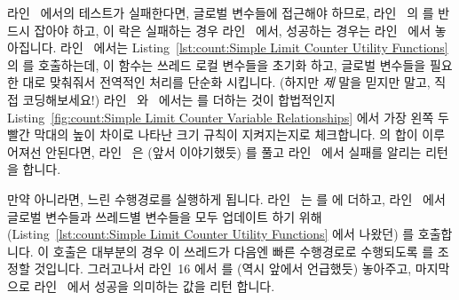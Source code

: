 \begin{lineref}
\begin{lineref}
라인~ 에서의 테스트가 실패한다면, 글로벌 변수들에 접근해야
하므로, 라인~ 의  를 반드시 잡아야 하고, 이
락은 실패하는 경우 라인~ 에서, 성공하는 경우는
라인~ 에서 놓아집니다.
라인~ 에서는
Listing~\ref{lst:count:Simple Limit Counter Utility Functions} 의
 를 호출하는데, 이 함수는 쓰레드 로컬 변수들을 초기화
하고, 글로벌 변수들을 필요한 대로 맞춰줘서 전역적인 처리를 단순화 시킵니다.
(하지만 \emph{제} 말을 믿지만 말고, 직접 코딩해보세요!)
라인~ 와~ 에서는  를 더하는 것이
합법적인지 Listing~\ref{fig:count:Simple Limit Counter Variable Relationships}
에서 가장 왼쪽 두 빨간 막대의 높이 차이로 나타난 크기 규칙이 지켜지는지로
체크합니다.
 의 합이 이루어져선 안된다면, 라인~ 은 (앞서
이야기했듯)  를 풀고 라인~ 에서 실패를 알리는
리턴을 합니다.

만약 아니라면, 느린 수행경로를 실행하게 됩니다.
라인~ 는  를  에 더하고,
라인~ 에서 글로벌 변수들과 쓰레드별 변수들을 모두 업데이트 하기
위해
(Listing~\ref{lst:count:Simple Limit Counter Utility Functions} 에서 나왔던)
 를 호출합니다.
이  호출은 대부분의 경우 이 쓰레드가 다음엔 빠른 수행경로로
수행되도록  를 조정할 것입니다.
그러고나서 라인~16 에서  를 (역시 앞에서
언급했듯) 놓아주고, 마지막으로 라인~ 에서 성공을 의미하는 값을
리턴 합니다.
\iffalse


\end{lineref}
\end{lineref}
